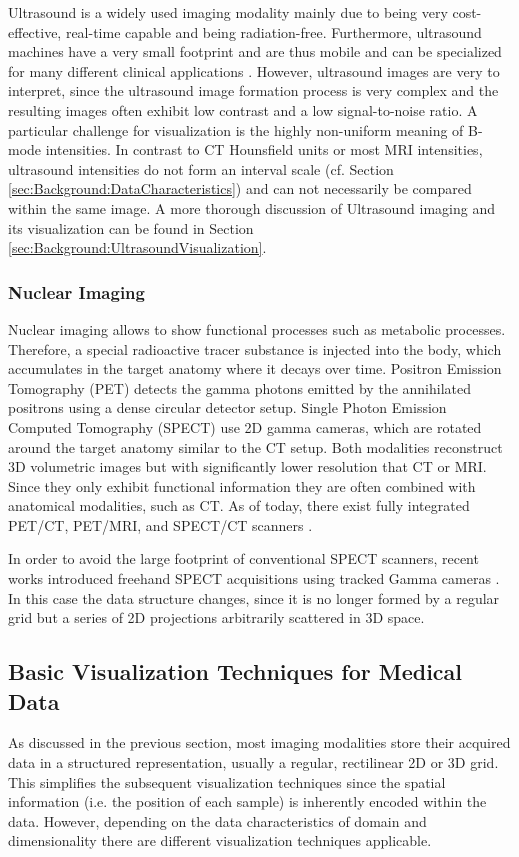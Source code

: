 Ultrasound is a widely used imaging modality mainly due to being very cost-effective, real-time capable and being radiation-free.
Furthermore, ultrasound machines have a very small footprint and are thus mobile and can be specialized for many different clinical applications \parencite{Noble:2011:Ultrasound}.
However, ultrasound images are very  to interpret, since the ultrasound image formation process is very complex and the resulting images often exhibit low contrast and a low signal-to-noise ratio.
A particular challenge for visualization is the highly non-uniform meaning of B-mode intensities.
In contrast to CT Hounsfield units or most MRI intensities, ultrasound intensities do not form an interval scale (cf. Section \ref{sec:Background:DataCharacteristics}) and can not necessarily be compared within the same image.
A more thorough discussion of Ultrasound imaging and its visualization can be found in Section \ref{sec:Background:UltrasoundVisualization}.


\subsubsection{Nuclear Imaging}
Nuclear imaging allows to show functional processes such as metabolic processes.
Therefore, a special radioactive tracer substance is injected into the body, which accumulates in the target anatomy where it decays over time.
Positron Emission Tomography (PET) detects the gamma photons emitted by the annihilated positrons using a dense circular detector setup.
Single Photon Emission Computed Tomography (SPECT) use 2D gamma cameras, which are rotated around the target anatomy similar to the CT setup.
Both modalities reconstruct 3D volumetric images but with significantly lower resolution that CT or MRI.
Since they only exhibit functional information they are often combined with anatomical modalities, such as CT.
As of today, there exist fully integrated PET/CT, PET/MRI, and SPECT/CT scanners \CN.

In order to avoid the large footprint of conventional SPECT scanners, recent works introduced freehand SPECT acquisitions using tracked Gamma cameras \CN.
In this case the data structure changes, since it is no longer formed by a regular grid but a series of 2D projections arbitrarily scattered in 3D space.




\subsection{Basic Visualization Techniques for Medical Data}
As discussed in the previous section, most imaging modalities store their acquired data in a structured representation, usually a regular, rectilinear 2D or 3D grid.
This simplifies the subsequent visualization techniques since the spatial information (i.e. the position of each sample) is inherently encoded within the data.
However, depending on the  data characteristics of domain and dimensionality there are different visualization techniques applicable.


